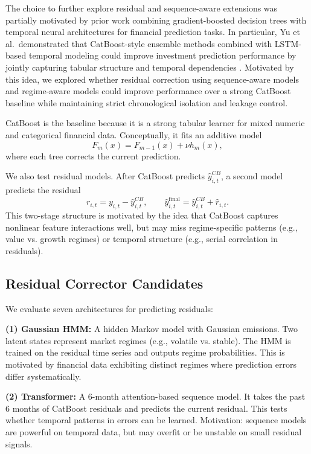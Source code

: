 \documentclass[11pt]{article}
\begin{document}
The choice to further explore residual and sequence-aware extensions was partially motivated by prior work combining gradient-boosted decision trees with temporal neural architectures for financial prediction tasks. In particular, Yu et al.\ demonstrated that CatBoost-style ensemble methods combined with LSTM-based temporal modeling could improve investment prediction performance by jointly capturing tabular structure and temporal dependencies \cite{yu2025gbdtlstm}. Motivated by this idea, we explored whether residual correction using sequence-aware models and regime-aware models could improve performance over a strong CatBoost baseline while maintaining strict chronological isolation and leakage control.

CatBoost is the baseline because it is a strong tabular learner for mixed numeric and categorical financial data. Conceptually, it fits an additive model
\begin{equation}
F_m(x) = F_{m-1}(x) + \nu h_m(x),
\end{equation}
where each tree corrects the current prediction.

We also test residual models. After CatBoost predicts \(\hat{y}^{CB}_{i,t}\), a second model predicts the residual
\begin{equation}
r_{i,t} = y_{i,t} - \hat{y}^{CB}_{i,t}, \qquad \hat{y}^{\text{final}}_{i,t} = \hat{y}^{CB}_{i,t} + \hat{r}_{i,t}.
\end{equation}
This two-stage structure is motivated by the idea that CatBoost captures nonlinear feature interactions well, but may miss regime-specific patterns (e.g., value vs. growth regimes) or temporal structure (e.g., serial correlation in residuals).

\subsection{Residual Corrector Candidates}

We evaluate seven architectures for predicting residuals:

\textbf{(1) Gaussian HMM:} A hidden Markov model with Gaussian emissions. Two latent states represent market regimes (e.g., volatile vs. stable). The HMM is trained on the residual time series and outputs regime probabilities. This is motivated by financial data exhibiting distinct regimes where prediction errors differ systematically.

\textbf{(2) Transformer:} A 6-month attention-based sequence model. It takes the past 6 months of CatBoost residuals and predicts the current residual. This tests whether temporal patterns in errors can be learned. Motivation: sequence models are powerful on temporal data, but may overfit or be unstable on small residual signals.
\end{document}
